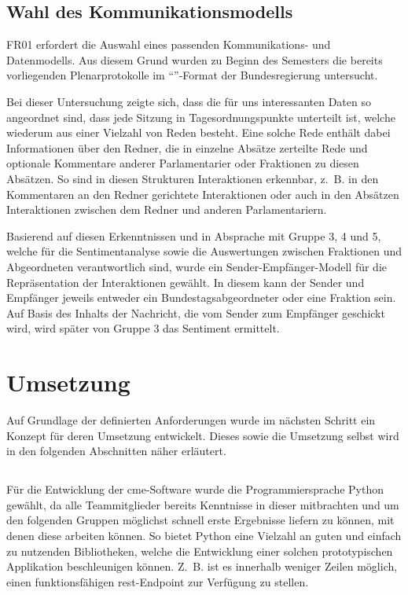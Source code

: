 \subsection{Wahl des Kommunikationsmodells}
FR01 erfordert die Auswahl eines passenden Kommunikations- und Datenmodells.
Aus diesem Grund wurden zu Beginn des Semesters die bereits vorliegenden
Plenarprotokolle im \enquote{}-Format der
Bundesregierung untersucht.

Bei dieser Untersuchung zeigte sich, dass die für uns interessanten Daten so
angeordnet sind, dass jede Sitzung in Tagesordnungspunkte unterteilt ist,
welche wiederum aus einer Vielzahl von Reden besteht. Eine solche Rede
enthält dabei Informationen über den Redner, die in einzelne Absätze
zerteilte Rede und optionale Kommentare anderer Parlamentarier oder
Fraktionen zu diesen Absätzen. So sind in diesen Strukturen Interaktionen
erkennbar, z.~B. in den Kommentaren an den Redner gerichtete Interaktionen oder
auch in den Absätzen Interaktionen zwischen dem Redner und anderen
Parlamentariern.

Basierend auf diesen Erkenntnissen und in Absprache mit Gruppe 3, 4 und 5,
welche für die Sentimentanalyse sowie die Auswertungen zwischen Fraktionen und
Abgeordneten verantwortlich sind, wurde ein Sender-Empfänger-Modell für die
Repräsentation der Interaktionen gewählt. In diesem kann der Sender und
Empfänger jeweils entweder ein Bundestagsabgeordneter oder eine Fraktion sein.
Auf Basis des Inhalts der Nachricht, die vom Sender zum Empfänger geschickt
wird, wird später von Gruppe 3 das Sentiment ermittelt.


\section{Umsetzung}\label{sec:03_02_umsetzung}
Auf Grundlage der definierten Anforderungen wurde im nächsten Schritt ein
Konzept für deren Umsetzung entwickelt. Dieses sowie die Umsetzung selbst
wird in den folgenden Abschnitten näher erläutert.

\subsection{}
Für die Entwicklung der \gls{cme}-Software wurde die Programmiersprache Python
gewählt, da alle Teammitglieder bereits Kenntnisse in dieser mitbrachten und
um den folgenden Gruppen möglichst schnell erste Ergebnisse liefern zu können,
mit denen diese arbeiten können. So bietet Python eine Vielzahl an guten und
einfach zu nutzenden Bibliotheken, welche die Entwicklung einer solchen
prototypischen Applikation beschleunigen können. Z.~B. ist es innerhalb
weniger Zeilen möglich, einen funktionsfähigen \gls{rest}-Endpoint zur
Verfügung zu stellen.

